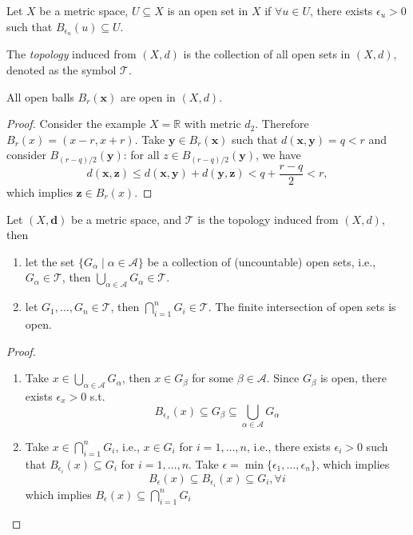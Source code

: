 \begin{definition}
Let $X$ be a metric space, $U\subseteq X$ is an open set in $X$ if $\forall u\in U$, there exists $\epsilon_u>0$ such that $B_{\epsilon_u}(u)\subseteq U$.
\end{definition}
\begin{definition}
The \emph{topology} induced from $(X,d)$ is the collection of all open sets in $(X,d)$, denoted as the symbol $\mathcal{T}$.
\end{definition}
\begin{proposition}
All open balls $B_r(\bm x)$ are open in $(X,d)$.
\end{proposition}
\begin{proof}
Consider the example $X=\mathbb{R}$ with metric $d_2$. Therefore $B_r(x)=(x-r,x+r)$. Take $\bm y\in B_r(\bm x)$ such that $d(\bm x,\bm y)=q<r$ and consider $B_{(r-q)/2}(\bm y)$: for all $z\in B_{(r-q)/2}(\bm y)$, we have
\[
d(\bm x,\bm z)\le d(\bm x,\bm y)+d(\bm y,\bm z)<q+\frac{r-q}{2}<r,
\]
which implies $\bm z\in B_r(x)$.
\end{proof}

\begin{proposition}
Let $(X,\bm d)$ be a metric space, and $\mathcal{T}$ is the topology induced from $(X,d)$, then
\begin{enumerate}
\item
let the set $\{G_\alpha\mid\alpha\in\mathcal{A}\}$ be a collection of (uncountable) open sets, i.e., $G_\alpha\in\mathcal{T}$, then $\bigcup_{\alpha\in\mathcal{A}}G_\alpha\in\mathcal{T}$.
\item
let $G_1,\dots,G_n\in\mathcal{T}$, then $\bigcap_{i=1}^nG_i\in\mathcal{T}$. The finite intersection of open sets is open.
\end{enumerate}
\end{proposition}
\begin{proof}
\begin{enumerate}
\item
Take $x\in\bigcup_{\alpha\in\mathcal{A}}G_\alpha$, 
then $x\in G_\beta$ for some $\beta\in\mathcal{A}$. 
Since $G_\beta$ is open, there exists $\epsilon_x>0$ s.t.
\[
B_{\epsilon_x}(x)\subseteq G_\beta\subseteq\bigcup_{\alpha\in\mathcal{A}}G_\alpha
\]
\item
Take $x\in\bigcap_{i=1}^nG_i$, i.e., $x\in G_i$ for $i=1,\dots,n$, i.e., there exists $\epsilon_i>0$ such that $B_{\epsilon_i}(x)\subseteq G_i$ for $i=1,\dots,n$. Take $\epsilon=\min\{\epsilon_1,\dots,\epsilon_n\}$, which implies
\[
B_\epsilon(x)\subseteq B_{\epsilon_i}(x)\subseteq G_i,\forall i
\]
which implies $B_\epsilon(x)\subseteq\bigcap_{i=1}^nG_i$
\end{enumerate}
\end{proof}
